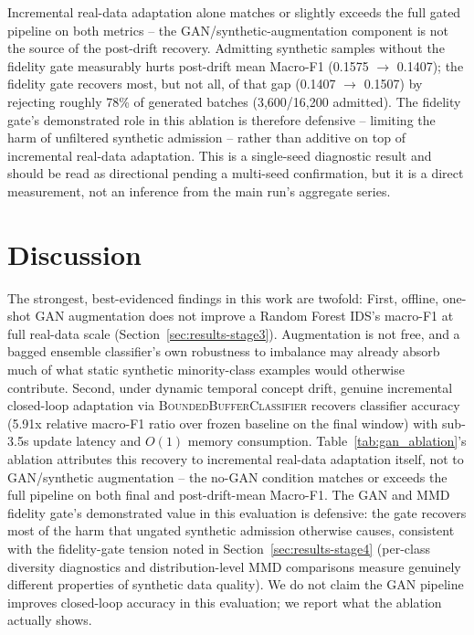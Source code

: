 \documentclass[conference]{IEEEtran}
\begin{document}
Incremental real-data adaptation alone matches or slightly exceeds the full gated pipeline on both
metrics -- the GAN/synthetic-augmentation component is not the source of the post-drift recovery.
Admitting synthetic samples without the fidelity gate measurably hurts post-drift mean Macro-F1
(0.1575 $\rightarrow$ 0.1407); the fidelity gate recovers most, but not all, of that gap (0.1407
$\rightarrow$ 0.1507) by rejecting roughly 78\% of generated batches (3,600/16,200 admitted). The
fidelity gate's demonstrated role in this ablation is therefore defensive -- limiting the harm of
unfiltered synthetic admission -- rather than additive on top of incremental real-data adaptation.
This is a single-seed diagnostic result and should be read as directional pending a multi-seed
confirmation, but it is a direct measurement, not an inference from the main run's aggregate
series.

\section{Discussion}

The strongest, best-evidenced findings in this work are twofold:
First, offline, one-shot GAN augmentation does not improve a Random Forest IDS's macro-F1 at full real-data scale (Section~\ref{sec:results-stage3}). Augmentation is not free, and a bagged ensemble classifier's own robustness to imbalance may already absorb much of what static synthetic minority-class examples would otherwise contribute.
Second, under dynamic temporal concept drift, genuine incremental closed-loop adaptation via \textsc{BoundedBufferClassifier} recovers classifier accuracy (5.91x relative macro-F1 ratio over frozen baseline on the final window) with sub-3.5s update latency and $O(1)$ memory consumption. Table~\ref{tab:gan_ablation}'s ablation attributes this recovery to incremental real-data adaptation itself, not to GAN/synthetic augmentation -- the no-GAN condition matches or exceeds the full pipeline on both final and post-drift-mean Macro-F1. The GAN and MMD fidelity gate's demonstrated value in this evaluation is defensive: the gate recovers most of the harm that ungated synthetic admission otherwise causes, consistent with the fidelity-gate tension noted in Section~\ref{sec:results-stage4} (per-class diversity diagnostics and distribution-level MMD comparisons measure genuinely different properties of synthetic data quality). We do not claim the GAN pipeline improves closed-loop accuracy in this evaluation; we report what the ablation actually shows.
\end{document}
